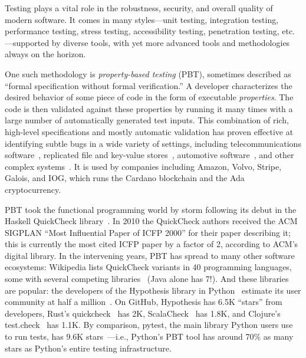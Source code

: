 Testing plays a vital role in the robustness, security, and overall
quality of modern software. It comes in many styles---unit testing,
integration testing, performance testing, stress testing,
accessibility testing, penetration testing, etc.---supported by
diverse tools, with yet more advanced tools and methodologies always on
the horizon.

One such methodology is {\em property-based testing} (PBT),
sometimes described as ``formal specification without formal
verification.''  A developer characterizes the desired
behavior of
some piece of code in the form of executable {\em
  properties}. The code is
then validated against these properties by running it many times
with a large number of automatically generated test inputs.
%
%
This combination of rich, high-level specifications and mostly
automatic validation has proven effective at identifying
subtle bugs in a wide variety of settings, including
telecommunications software~\cite{arts2006testing}, replicated
file and key-value
stores~\cite{MysteriesOfDropbox2016,Bornholt2021}, automotive
software~\cite{arts2015testing}, and other complex
systems~\cite{hughes2016experiences}.
It is used by companies including Amazon, Volvo, Stripe, Galois,
and IOG, which
runs the Cardano blockchain and the Ada cryptocurrency.

PBT took the functional programming world by storm following its
debut in the Haskell QuickCheck library~\cite{ClaessenHughes00}.  In
2010 the
QuickCheck authors received the ACM SIGPLAN ``Most Influential Paper of ICFP
2000'' for their paper describing it; this is currently the most cited
ICFP paper by
a factor of 2, according to ACM's digital library.  In the intervening
years, PBT has spread to many other software ecosystems:
%
Wikipedia lists QuickCheck variants in 40 programming languages, some
with several competing libraries~\cite{QuickCheckWikipedia} (Java alone has
7!).
%
And these libraries are popular:
the developers of the Hypothesis library in
Python~\cite{maciver2019hypothesis,HypothesisGithub} estimate its user community
at half a million~\cite{ZacPersonalCommunication,noauthor_python_nodate}.  On GitHub,
Hypothesis has 6.5K ``stars'' from developers, Rust's
quickcheck~\cite{RustQuickcheckGithub} has 2K,
ScalaCheck~\cite{ScalaCheckGithub} has 1.8K, and Clojure's
test.check~\cite{ClojureTest.checkGithub} has 1.1K.
By comparison, pytest, the main library Python users use to run
tests, has 9.6K stars~\cite{PytestGitHub}---i.e., Python's
PBT tool has around 70\% as many stars as Python's entire testing
infrastructure.

